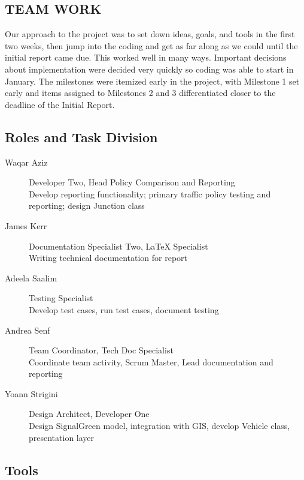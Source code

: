 \documentclass[11pt]{article}
\begin{document}
\begin{enumerate}
\section{TEAM WORK}

Our approach to the project was to set down ideas, goals, and tools in the first two weeks, then jump into the coding and get as far along as we could until the initial report came due. This worked well in many ways. Important decisions about implementation were decided very quickly so coding was able to start in January. The milestones were itemized early in the project, with Milestone 1 set early and items assigned to Milestones 2 and 3 differentiated closer to the deadline of the Initial Report.


\subsection{Roles and Task Division}

\begin{description}
\item [Waqar Aziz] \hspace{16 mm} Developer Two, Head Policy Comparison and Reporting \\
	Develop reporting functionality; primary traffic policy testing and reporting; design Junction class
\item[James Kerr] \hspace{16 mm}  Documentation Specialist Two, LaTeX Specialist \\
	Writing technical documentation for report
\item[Adeela Saalim] \hspace{11 mm} Testing Specialist \\
	Develop test cases, run test cases, document testing
\item[Andrea Senf] \hspace{15 mm} Team Coordinator, Tech Doc Specialist \\
	Coordinate team activity, Scrum Master, Lead documentation and reporting
\item[Yoann Strigini] \hspace{11 mm}  Design Architect, Developer One \\
	Design SignalGreen model, integration with GIS, develop Vehicle class, presentation layer
\end{description}

\subsection{Tools}


\end{enumerate}
\end{document}
